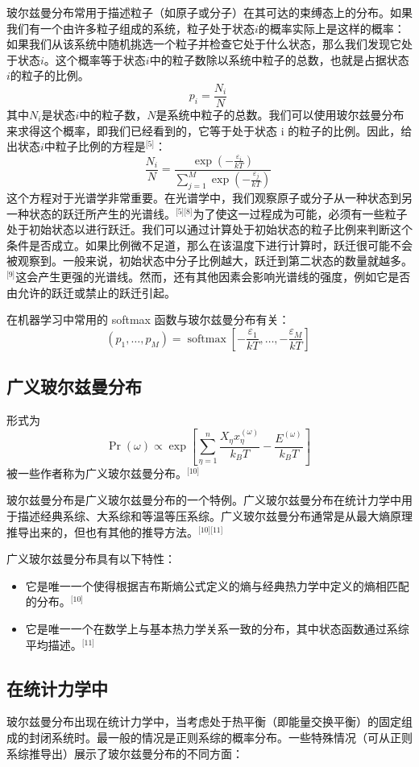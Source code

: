 玻尔兹曼分布常用于描述粒子（如原子或分子）在其可达的束缚态上的分布。如果我们有一个由许多粒子组成的系统，粒子处于状态\(i\)的概率实际上是这样的概率：如果我们从该系统中随机挑选一个粒子并检查它处于什么状态，那么我们发现它处于状态\(i\)。这个概率等于状态\(i\)中的粒子数除以系统中粒子的总数，也就是占据状态\(i\)的粒子的比例。
\[
p_i = \frac{N_i}{N}~
\]
其中\( N_i \)是状态\(i\)中的粒子数，\( N \)是系统中粒子的总数。我们可以使用玻尔兹曼分布来求得这个概率，即我们已经看到的，它等于处于状态 i 的粒子的比例。因此，给出状态\(i\)中粒子比例的方程是\(^\text{[5]}\)：
\[
\frac{N_i}{N} = \frac{\exp \left( -\frac{\varepsilon_i}{kT} \right)}{\sum_{j=1}^{M} \exp \left( -\frac{\varepsilon_j}{kT} \right)}~
\]
这个方程对于光谱学非常重要。在光谱学中，我们观察原子或分子从一种状态到另一种状态的跃迁所产生的光谱线。\(^\text{[5][8]}\)为了使这一过程成为可能，必须有一些粒子处于初始状态以进行跃迁。我们可以通过计算处于初始状态的粒子比例来判断这个条件是否成立。如果比例微不足道，那么在该温度下进行计算时，跃迁很可能不会被观察到。一般来说，初始状态中分子比例越大，跃迁到第二状态的数量就越多。\(^\text{[9]}\)这会产生更强的光谱线。然而，还有其他因素会影响光谱线的强度，例如它是否由允许的跃迁或禁止的跃迁引起。

在机器学习中常用的 softmax 函数与玻尔兹曼分布有关：
\[
(p_1, \ldots, p_M) = \operatorname{softmax} \left[ -\frac{\varepsilon_1}{kT}, \ldots, -\frac{\varepsilon_M}{kT} \right]~
\]
\subsection{广义玻尔兹曼分布}
形式为
\[
\Pr \left(\omega \right) \propto \exp \left[ \sum_{\eta =1}^{n} \frac{X_{\eta} x_{\eta}^{(\omega)}}{k_B T} - \frac{E^{(\omega)}}{k_B T} \right]~
\]
被一些作者称为广义玻尔兹曼分布。\(^\text{[10]}\)

玻尔兹曼分布是广义玻尔兹曼分布的一个特例。广义玻尔兹曼分布在统计力学中用于描述经典系综、大系综和等温等压系综。广义玻尔兹曼分布通常是从最大熵原理推导出来的，但也有其他的推导方法。\(^\text{[10][11]}\)

广义玻尔兹曼分布具有以下特性：
\begin{itemize}
\item 它是唯一一个使得根据吉布斯熵公式定义的熵与经典热力学中定义的熵相匹配的分布。\(^\text{[10]}\)
\item 它是唯一一个在数学上与基本热力学关系一致的分布，其中状态函数通过系综平均描述。\(^\text{[11]}\)
\end{itemize}
\subsection{在统计力学中}  
玻尔兹曼分布出现在统计力学中，当考虑处于热平衡（即能量交换平衡）的固定组成的封闭系统时。最一般的情况是正则系综的概率分布。一些特殊情况（可从正则系综推导出）展示了玻尔兹曼分布的不同方面：

